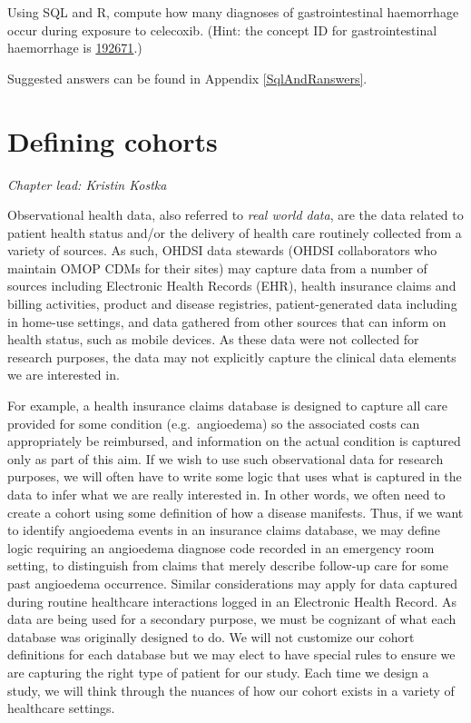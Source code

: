 \documentclass[11pt]{book}
\theoremstyle{definition}
\theoremstyle{definition}
\theoremstyle{definition}
\theoremstyle{remark}
\let\BeginKnitrBlock\begin \let\EndKnitrBlock\end
\begin{document}
\BeginKnitrBlock{exercise}
\protect\hypertarget{exr:exerciseGiBleedsDuringCelecoxib}{}{\label{exr:exerciseGiBleedsDuringCelecoxib} }Using SQL and R, compute how many diagnoses of gastrointestinal haemorrhage occur during exposure to celecoxib. (Hint: the concept ID for gastrointestinal haemorrhage is \href{http://athena.ohdsi.org/search-terms/terms/192671}{192671}.)
\EndKnitrBlock{exercise}

Suggested answers can be found in Appendix \ref{SqlAndRanswers}.

\hypertarget{Cohorts}{%
\chapter{Defining cohorts}\label{Cohorts}}

\emph{Chapter lead: Kristin Kostka}

Observational health data, also referred to \emph{real world data}, are the data related to patient health status and/or the delivery of health care routinely collected from a variety of sources. As such, OHDSI data stewards (OHDSI collaborators who maintain OMOP CDMs for their sites) may capture data from a number of sources including Electronic Health Records (EHR), health insurance claims and billing activities, product and disease registries, patient-generated data including in home-use settings, and data gathered from other sources that can inform on health status, such as mobile devices. As these data were not collected for research purposes, the data may not explicitly capture the clinical data elements we are interested in.

For example, a health insurance claims database is designed to capture all care provided for some condition (e.g.~angioedema) so the associated costs can appropriately be reimbursed, and information on the actual condition is captured only as part of this aim. If we wish to use such observational data for research purposes, we will often have to write some logic that uses what is captured in the data to infer what we are really interested in. In other words, we often need to create a cohort using some definition of how a disease manifests. Thus, if we want to identify angioedema events in an insurance claims database, we may define logic requiring an angioedema diagnose code recorded in an emergency room setting, to distinguish from claims that merely describe follow-up care for some past angioedema occurrence. Similar considerations may apply for data captured during routine healthcare interactions logged in an Electronic Health Record. As data are being used for a secondary purpose, we must be cognizant of what each database was originally designed to do. We will not customize our cohort definitions for each database but we may elect to have special rules to ensure we are capturing the right type of patient for our study. Each time we design a study, we will think through the nuances of how our cohort exists in a variety of healthcare settings.
\end{document}
